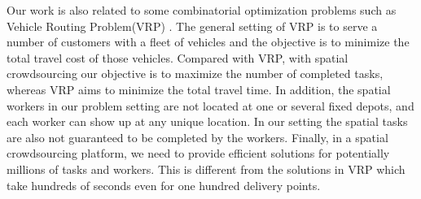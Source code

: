 Our work is also related to some combinatorial optimization problems such as Vehicle Routing Problem(VRP) \cite{Braysy05}. The general setting of VRP is to serve a number of customers with a fleet of vehicles and the objective is to minimize the total travel cost of those vehicles. Compared with VRP, with spatial crowdsourcing our objective is to maximize the number of completed tasks, whereas VRP aims to minimize the total travel time. In addition, the spatial workers in our problem setting are not located at one or several fixed depots, and each worker can show up at any unique location. In our setting the spatial tasks are also not guaranteed to be completed by the workers. Finally, in a spatial crowdsourcing platform, we need to provide efficient solutions for potentially millions of tasks and workers. This is different from the solutions in VRP which take hundreds of seconds even for one hundred delivery points.



